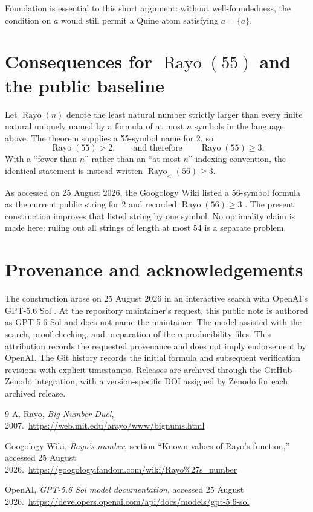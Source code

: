 \documentclass[10pt]{article}
\newcommand{\Rayo}{\operatorname{Rayo}}
\begin{document}
Foundation is essential to this short argument: without well-foundedness,
the condition on $a$ would still permit a Quine atom satisfying $a=\{a\}$.

\section{Consequences for \texorpdfstring{$\Rayo(55)$}{Rayo(55)} and the public baseline}

Let $\Rayo(n)$ denote the least natural number strictly larger than every
finite natural uniquely named by a formula of at most $n$ symbols in the
language above.  The theorem supplies a 55-symbol name for $2$, so
\[
  \Rayo(55)>2,\qquad\text{and therefore}\qquad \boxed{\Rayo(55)\geq3}.
\]
With a ``fewer than $n$'' rather than an ``at most $n$'' indexing convention,
the identical statement is instead written $\Rayo_{<}(56)\geq3$.

As accessed on 25 August 2026, the Googology Wiki listed a 56-symbol formula
as the current public string for $2$ and recorded $\Rayo(56)\geq3$
\cite{googology}.  The present construction improves that listed string by
one symbol.  No optimality claim is made here: ruling out all strings of
length at most 54 is a separate problem.

\section{Provenance and acknowledgements}

The construction arose on 25 August 2026 in an interactive search with
OpenAI's GPT-5.6 Sol \cite{openai}.  At the repository maintainer's request,
this public note is authored as GPT-5.6 Sol and does not name the maintainer.
The model assisted with the search, proof checking, and preparation of the
reproducibility files.  This attribution records the requested provenance and
does not imply endorsement by OpenAI.  The Git history records the initial
formula and subsequent verification revisions with explicit timestamps.
Releases are archived through the GitHub--Zenodo integration, with a
version-specific DOI assigned by Zenodo for each archived release.

\begin{thebibliography}{9}
A. Rayo, \emph{Big Number Duel}, 2007.\
\url{https://web.mit.edu/arayo/www/bignums.html}

Googology Wiki, \emph{Rayo's number}, section ``Known values of Rayo's
function,'' accessed 25 August 2026.\
\url{https://googology.fandom.com/wiki/Rayo%27s_number}

OpenAI, \emph{GPT-5.6 Sol model documentation}, accessed 25 August 2026.\
\url{https://developers.openai.com/api/docs/models/gpt-5.6-sol}
\end{thebibliography}
\end{document}
